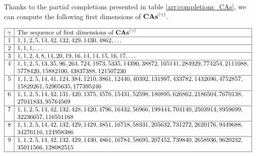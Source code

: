 Thanks to the partial completions presented in table
\eqref{arr:completions_CAs}, we can compute the following first
dimensions of $\mathbf{CAs}^{\left(\gamma\right)}$.
\begin{center}
  \begin{math} \label{arr:dimensions_CAs}
    \begin{array}{|c|l|}
      \hline
      \gamma & \mbox{The sequence of first dimensions of }
       \mathbf{CAs}^{\left(\gamma\right)}\\ \hline
      1 & 1, 1, 2, 5, 14, 42, 132, 429, 1430, 4862, \dots \\ \hline
      2 & 1, 1, 1, \dots \\ \hline
      3 & 1, 1, 2, 4, 8, 14, 20, 19, 16, 14,
          14, 15, 16, 17, \dots \\ \hline
      4 & 1, 1, 2, 5, 13, 35, 96, 264, 724, 1973, 5335, 14390, 38872,
          105141, 284929, 774254, 2111088,\\
        & 5778420, 15882100, 43837388, 121507230 \\ \hline
      5 & 1, 1, 2, 5, 14, 41, 124, 384, 1210, 3861, 12440, 40392, 131997,
          433782, 1432696, 4752857, \\
        & 15829261, 52905635, 177395246 \\ \hline
      6 & 1, 1, 2, 5, 14, 42, 131, 420, 1375, 4576, 15431, 52598, 180895,
          626862, 2186504, 7670138, \\
        & 27041833, 95764569 \\ \hline
      7 & 1, 1, 2, 5, 14, 42, 132, 428, 1420, 4796, 16432, 56966, 199444,
          704140, 2503914, 8959699, \\
        & 32236657, 116551168\\ \hline
      8 & 1, 1, 2, 5, 14, 42, 132, 429, 1429, 4851, 16718, 58331, 205632,
          731272, 2620176, 9449688, \\
        & 34276116, 124958386\\ \hline
      9 & 1, 1, 2, 5, 14, 42, 132, 429, 1430, 4861, 16784, 58695, 207452,
          739840, 2658936, 9620232, \\
        & 35011566, 128082515\\ \hline
    \end{array}
  \end{math}
\end{center}
\medbreak

